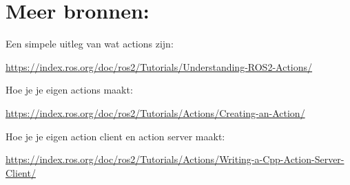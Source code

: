 \section{Meer bronnen:}
\label{sec:action_meer_bronnen}
Een simpele uitleg van wat actions zijn:
\begin{center}
    {\footnotesize \url{https://index.ros.org/doc/ros2/Tutorials/Understanding-ROS2-Actions/}}
\end{center}
\noindent Hoe je je eigen actions maakt:
\begin{center}
    {\footnotesize \url{https://index.ros.org/doc/ros2/Tutorials/Actions/Creating-an-Action/}}
\end{center}
\noindent Hoe je je eigen action client en action server maakt:
\begin{center}
    {\footnotesize \url{https://index.ros.org/doc/ros2/Tutorials/Actions/Writing-a-Cpp-Action-Server-Client/}}
\end{center}



